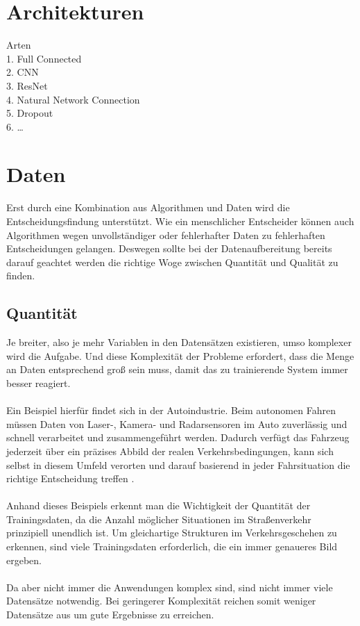 \documentclass[12pt,oneside,a4paper,parskip]{scrbook}
\begin{document}
\section{Architekturen}
Arten
\\1.	Full Connected
\\2.	CNN
\\3.	ResNet
\\4.	Natural Network Connection
\\5.	Dropout
\\6.	…

\section{Daten}
\label{section:Data}
Erst durch eine Kombination aus Algorithmen und Daten wird die Entscheidungsfindung unterstützt. Wie ein menschlicher Entscheider können auch Algorithmen wegen unvollständiger oder fehlerhafter Daten zu fehlerhaften Entscheidungen gelangen.
Deswegen sollte bei der Datenaufbereitung bereits darauf geachtet werden die richtige Woge zwischen Quantität und Qualität zu finden.

\subsection{Quantität}
\label{section:DataQuantity}
Je breiter, also je mehr Variablen in den Datensätzen existieren, umso komplexer wird die Aufgabe. Und diese Komplexität der Probleme erfordert, dass die Menge an Daten entsprechend groß sein muss, damit das zu trainierende System immer besser reagiert.
\\\\
Ein Beispiel hierfür findet sich in der Autoindustrie. Beim autonomen Fahren müssen Daten von Laser-, Kamera- und Radarsensoren im Auto zuverlässig und schnell verarbeitet und zusammengeführt werden. Dadurch verfügt das Fahrzeug jederzeit über ein präzises Abbild der realen Verkehrsbedingungen, kann sich selbst in diesem Umfeld verorten und darauf basierend in jeder Fahrsituation die richtige Entscheidung treffen \cite{autonomesFahren}.
\\\\
Anhand dieses Beispiels erkennt man die Wichtigkeit der Quantität der Trainingsdaten, da die Anzahl möglicher Situationen im Straßenverkehr prinzipiell unendlich ist. Um gleichartige Strukturen im Verkehrsgeschehen zu erkennen, sind viele Trainingsdaten erforderlich, die ein immer genaueres Bild ergeben.
\\\\
Da aber nicht immer die Anwendungen komplex sind, sind nicht immer viele Datensätze notwendig. Bei geringerer Komplexität reichen somit weniger Datensätze aus um gute Ergebnisse zu erreichen.
\end{document}
